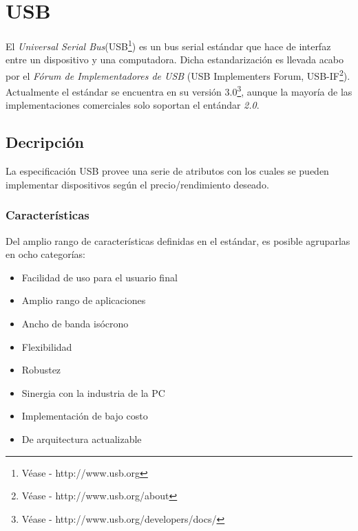 \chapter{USB}\label{cap:usb}

El \emph{Universal Serial Bus}(USB\footnote{V\'ease - http://www.usb.org}) es
un bus serial est\'andar que hace de interfaz entre un dispositivo y una
computadora.
Dicha estandarizaci\'on es llevada acabo por el \emph{F\'orum de
Implementadores de USB} (USB Implementers Forum, USB-IF\footnote{V\'ease -
http://www.usb.org/about}). 
Actualmente el est\'andar se encuentra en su versi\'on 3.0\footnote{V\'ease -
http://www.usb.org/developers/docs/}, aunque la mayor\'ia de las
implementaciones comerciales solo soportan el ent\'andar \emph{2.0}.


\clearpage
\section{Decripci\'on}
La especificaci\'on USB provee una serie de atributos con los cuales se pueden
implementar dispositivos seg\'un el precio/rendimiento deseado.

\subsection{Caracter\'isticas}
Del amplio rango de caracter\'isticas definidas en el est\'andar, es posible
agruparlas en ocho categor\'ias:

\begin{itemize}
 \item Facilidad de uso para el usuario final
 \item Amplio rango de aplicaciones
 \item Ancho de banda is\'ocrono
 \item Flexibilidad
 \item Robustez
 \item Sinergia con la industria de la PC
 \item Implementaci\'on de bajo costo
 \item De arquitectura actualizable
\end{itemize}

